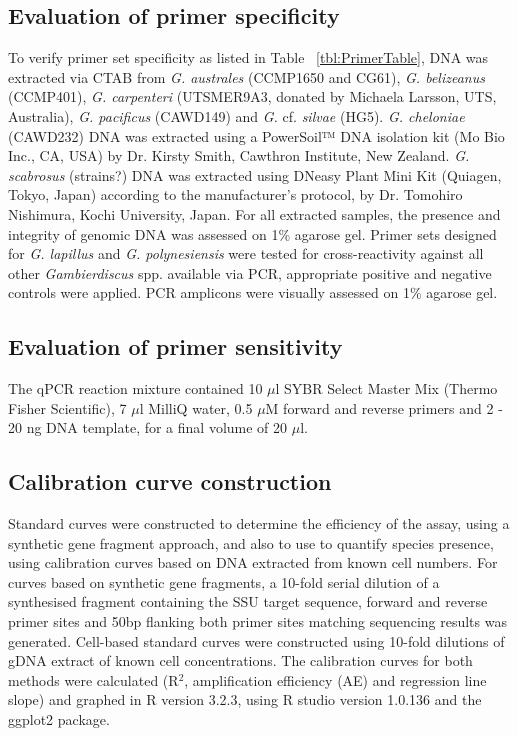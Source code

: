 \documentclass[12pt]{article}
\begin{document}
\subsection*{Evaluation of primer specificity}
To verify primer set specificity as listed in Table ~\ref{tbl:PrimerTable}, DNA was extracted via CTAB from \emph{G. australes} (CCMP1650 and CG61), \emph{G. belizeanus} (CCMP401), \emph{G. carpenteri} (UTSMER9A3, donated by Michaela Larsson, UTS, Australia), \emph{G. pacificus} (CAWD149) and \emph{G.} cf. \emph{silvae} (HG5). \emph{G. cheloniae} (CAWD232) DNA was extracted using a PowerSoil™ DNA isolation kit (Mo Bio Inc., CA, USA) by Dr. Kirsty Smith, Cawthron Institute, New Zealand. \emph{G. scabrosus} (strains?) DNA was extracted using DNeasy Plant Mini Kit (Quiagen, Tokyo, Japan) according to the manufacturer's protocol, by Dr. Tomohiro Nishimura, Kochi University, Japan. For all extracted samples, the presence and integrity of genomic DNA was assessed on 1\% agarose gel. Primer sets designed for \emph{G. lapillus} and \emph{G. polynesiensis} were tested for cross-reactivity against all other \emph{Gambierdiscus} spp. available via PCR, appropriate positive and negative controls were applied. PCR amplicons were visually assessed on 1\% agarose gel.


\subsection*{Evaluation of primer sensitivity}
The qPCR reaction mixture contained 10 $\mu$l SYBR Select Master Mix (Thermo Fisher Scientific), 7 $\mu$l MilliQ water, 0.5 $\mu$M forward and reverse primers and 2 - 20 ng DNA template, for a final volume of 20 $\mu$l.
\subsection*{Calibration curve construction}
Standard curves were constructed to determine the efficiency of the assay, using a synthetic gene fragment approach, and also to use to quantify species presence, using calibration curves based on DNA extracted from known cell numbers. For curves based on synthetic gene fragments, a 10-fold serial dilution of a synthesised fragment containing the SSU target sequence, forward and reverse primer sites and 50bp flanking both primer sites matching sequencing results was generated. Cell-based standard curves were constructed using 10-fold dilutions of gDNA extract of known cell concentrations.
The calibration curves for both methods were calculated (R$^{2}$, amplification efficiency (AE) and regression line slope) and graphed in R version 3.2.3, using R studio version 1.0.136 and the ggplot2 package. 
\end{document}
